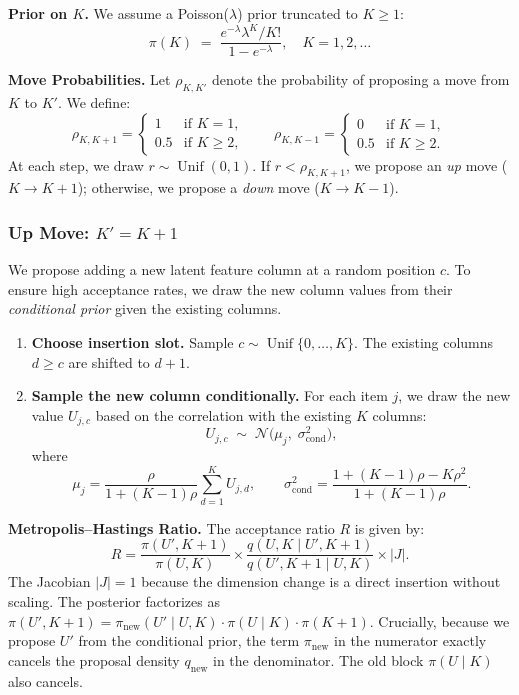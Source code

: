 \documentclass{article}
\theoremstyle{plain}
\theoremstyle{definition}
\theoremstyle{remark}
\begin{document}
\noindent \textbf{Prior on $K$.}
We assume a Poisson($\lambda$) prior truncated to $K \ge 1$:
\[
  \pi(K) \;=\; \frac{e^{-\lambda}\lambda^{K}/K!}{1-e^{-\lambda}}, \quad K=1,2,\dots
\]

\noindent \textbf{Move Probabilities.}
Let $\rho_{K,K'}$ denote the probability of proposing a move from $K$ to $K'$. We define:
\[
  \rho_{K,K+1}= \begin{cases}
     1   & \text{if } K=1,\\
     0.5 & \text{if } K\ge 2,
  \end{cases}
  \qquad
  \rho_{K,K-1}= \begin{cases}
     0   & \text{if } K=1,\\
     0.5 & \text{if } K\ge 2.
  \end{cases}
\]
At each step, we draw $r \sim \operatorname{Unif}(0,1)$. If $r < \rho_{K,K+1}$, we propose an \emph{up} move ($K \to K+1$); otherwise, we propose a \emph{down} move ($K \to K-1$).

\subsubsection{Up Move: \(K' = K+1\)}

We propose adding a new latent feature column at a random position $c$. To ensure high acceptance rates, we draw the new column values from their \emph{conditional prior} given the existing columns.

\begin{enumerate}
    \item \textbf{Choose insertion slot.} Sample $c \sim \operatorname{Unif}\{0,\dots,K\}$. The existing columns $d \ge c$ are shifted to $d+1$.
    
    \item \textbf{Sample the new column conditionally.} 
    For each item $j$, we draw the new value $U_{j,c}$ based on the correlation with the existing $K$ columns:
    \[
      U_{j,c} \;\sim\; \mathcal{N}\bigl(\mu_j,\;\sigma_{\text{cond}}^{2}\bigr),
    \]
    where
    \[
      \mu_j = \frac{\rho}{1+(K-1)\rho} \sum_{d=1}^{K} U_{j,d}, \qquad
      \sigma_{\text{cond}}^{2} = \frac{1+(K-1)\rho-K\rho^{2}}{1+(K-1)\rho}.
    \]
\end{enumerate}

\noindent \textbf{Metropolis--Hastings Ratio.}
The acceptance ratio $R$ is given by:
\[
  R = \frac{\pi(U', K+1)}{\pi(U, K)} \times \frac{q(U, K \mid U', K+1)}{q(U', K+1 \mid U, K)} \times |J|.
\]
The Jacobian $|J|=1$ because the dimension change is a direct insertion without scaling. The posterior factorizes as $\pi(U', K+1) = \pi_{\text{new}}(U' \mid U, K) \cdot \pi(U \mid K) \cdot \pi(K+1)$. Crucially, because we propose $U'$ from the conditional prior, the term $\pi_{\text{new}}$ in the numerator exactly cancels the proposal density $q_{\text{new}}$ in the denominator. The old block $\pi(U \mid K)$ also cancels.
\end{document}
